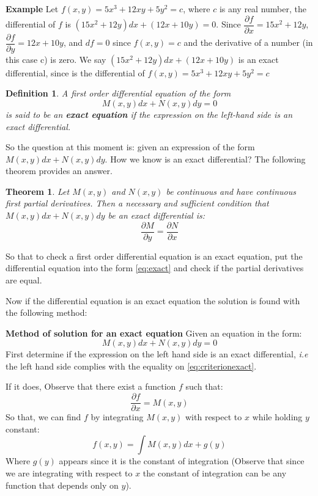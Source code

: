 \documentclass[10pt,a4paper]{article}
\newtheorem{define}{Definition}
\newtheorem{thm}{Theorem}
\begin{document}
\textbf{Example}
Let $ f(x,y) = 5x^3 + 12xy + 5y^2 = c $, where $c$ is any real number, the differential of $f$ is $ (15x^2 + 12y) dx + ( 12x + 10y) = 0 $. Since $ \dfrac{\partial f}{\partial x} = 15x^2 + 12y $, $\dfrac{\partial f}{\partial y} = 12x + 10y$, and $ df = 0 $ since $ f(x,y) = c$ and the derivative of a number (in this case c) is zero. We say $ (15x^2 + 12y) dx + ( 12x + 10y)  $ is an exact differential, since is the differential of $ f(x,y) = 5x^3 + 12xy + 5y^2 = c$
\begin{define}
A first order differential equation of the form
\begin{equation} \label{eq:exact}
M(x,y)dx + N(x,y)dy = 0
\end{equation}
is said to be an \textbf{exact equation} if the expression on the left-hand side is an exact differential.
\end{define}
So the question at this moment is: given an expression of the form $M(x,y)dx + N(x,y)dy$. How we know is an exact differential? The following theorem provides an answer.
\begin{thm}
Let $M(x,y)$ and $N(x,y)$ be continuous and have continuous first partial derivatives. Then a necessary and sufficient condition that $M(x,y)dx + N(x,y)dy$ be an exact differential is:
\begin{equation} \label{eq:criterionexact}
\dfrac{\partial M}{\partial y} = \dfrac{\partial N}{\partial x}
\end{equation} 
\end{thm}
So that to check a first order differential equation is an exact equation, put the differential equation into the form \eqref{eq:exact} and check if the partial derivatives are equal.

Now if the differential equation is an exact equation the solution is found with the following method:

\textbf{Method of solution for an exact equation}
Given an equation in the form:
\begin{equation*}
M(x,y)dx + N(x,y)dy = 0
\end{equation*}
First determine if the expression on the left hand side is an exact differential, \textit{i.e} the left hand side complies with the equality on \eqref{eq:criterionexact}. 

If it does, Observe that there exist a function $f$ such that:
\begin{equation*}
\dfrac{\partial f}{\partial x} = M(x,y)
\end{equation*}
So that, we can find $f$ by integrating $M(x,y)$ with respect to $x$ while holding $y$ constant:
\begin{equation*}
f(x,y) = \int M(x,y) dx + g(y)
\end{equation*}
Where $g(y)$ appears since it is the constant of integration (Observe that since we are integrating with respect to $x$ the constant of integration can be any function that depends only on $y$).
\end{document}
